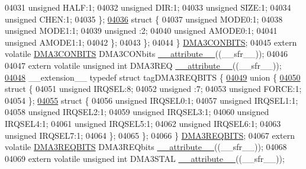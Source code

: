 \begin{DoxyCode}
04031       \textcolor{keywordtype}{unsigned} HALF:1;
04032       \textcolor{keywordtype}{unsigned} DIR:1;
04033       \textcolor{keywordtype}{unsigned} SIZE:1;
04034       \textcolor{keywordtype}{unsigned} CHEN:1;
04035     \};
\hypertarget{a00015_source_l04036}{}\hyperlink{a00015}{04036}     \textcolor{keyword}{struct }\{
04037       \textcolor{keywordtype}{unsigned} MODE0:1;
04038       \textcolor{keywordtype}{unsigned} MODE1:1;
04039       \textcolor{keywordtype}{unsigned} :2;
04040       \textcolor{keywordtype}{unsigned} AMODE0:1;
04041       \textcolor{keywordtype}{unsigned} AMODE1:1;
04042     \};
04043   \};
04044 \} \hyperlink{a00014_dc/df3/a00424}{DMA3CONBITS};
04045 \textcolor{keyword}{extern} \textcolor{keyword}{volatile} \hyperlink{a00014_dc/df3/a00424}{DMA3CONBITS} DMA3CONbits \hyperlink{a00015_a493c46f03454991ccc5aa7a6e1dfb2a7}{\_\_attribute\_\_}((\_\_sfr\_\_));
04046 
04047 \textcolor{keyword}{extern} \textcolor{keyword}{volatile} \textcolor{keywordtype}{unsigned} \textcolor{keywordtype}{int}  DMA3REQ \hyperlink{a00015_a493c46f03454991ccc5aa7a6e1dfb2a7}{\_\_attribute\_\_}((\_\_sfr\_\_));
\hypertarget{a00015_source_l04048}{}\hyperlink{a00014}{04048} \_\_extension\_\_ \textcolor{keyword}{typedef} \textcolor{keyword}{struct }tagDMA3REQBITS \{
\hypertarget{a00015_source_l04049}{}\hyperlink{a00015}{04049}   \textcolor{keyword}{union }\{
\hypertarget{a00015_source_l04050}{}\hyperlink{a00015}{04050}     \textcolor{keyword}{struct }\{
04051       \textcolor{keywordtype}{unsigned} IRQSEL:8;
04052       \textcolor{keywordtype}{unsigned} :7;
04053       \textcolor{keywordtype}{unsigned} FORCE:1;
04054     \};
\hypertarget{a00015_source_l04055}{}\hyperlink{a00015}{04055}     \textcolor{keyword}{struct }\{
04056       \textcolor{keywordtype}{unsigned} IRQSEL0:1;
04057       \textcolor{keywordtype}{unsigned} IRQSEL1:1;
04058       \textcolor{keywordtype}{unsigned} IRQSEL2:1;
04059       \textcolor{keywordtype}{unsigned} IRQSEL3:1;
04060       \textcolor{keywordtype}{unsigned} IRQSEL4:1;
04061       \textcolor{keywordtype}{unsigned} IRQSEL5:1;
04062       \textcolor{keywordtype}{unsigned} IRQSEL6:1;
04063       \textcolor{keywordtype}{unsigned} IRQSEL7:1;
04064     \};
04065   \};
04066 \} \hyperlink{a00014_da/db6/a00427}{DMA3REQBITS};
04067 \textcolor{keyword}{extern} \textcolor{keyword}{volatile} \hyperlink{a00014_da/db6/a00427}{DMA3REQBITS} DMA3REQbits \hyperlink{a00015_a493c46f03454991ccc5aa7a6e1dfb2a7}{\_\_attribute\_\_}((\_\_sfr\_\_));
04068 
04069 \textcolor{keyword}{extern} \textcolor{keyword}{volatile} \textcolor{keywordtype}{unsigned} \textcolor{keywordtype}{int}  DMA3STAL \hyperlink{a00015_a493c46f03454991ccc5aa7a6e1dfb2a7}{\_\_attribute\_\_}((\_\_sfr\_\_));

\end{DoxyCode}
